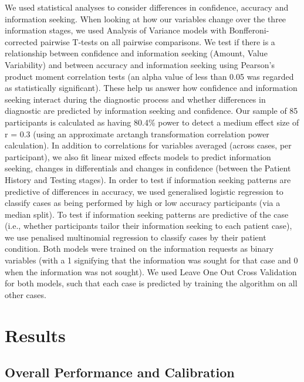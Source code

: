 \documentclass[a4paper, nobind]{templates/ociamthesis}
\begin{document}
\hfill\break
We used statistical analyses to consider differences in confidence, accuracy and information seeking. When looking at how our variables change over the three information stages, we used Analysis of Variance models with Bonfferoni-corrected pairwise T-tests on all pairwise comparisons. We test if there is a relationship between confidence and information seeking (Amount, Value Variability) and between accuracy and information seeking using Pearson's product moment correlation tests (an alpha value of less than 0.05 was regarded as statistically significant). These help us answer how confidence and information seeking interact during the diagnostic process and whether differences in diagnostic are predicted by information seeking and confidence. Our sample of 85 participants is calculated as having 80.4\% power to detect a medium effect size of r = 0.3 (using an approximate arctangh transformation correlation power calculation). In addition to correlations for variables averaged (across cases, per participant), we also fit linear mixed effects models to predict information seeking, changes in differentials and changes in confidence (between the Patient History and Testing stages). In order to test if information seeking patterns are predictive of differences in accuracy, we used generalised logistic regression to classify cases as being performed by high or low accuracy participants (via a median split). To test if information seeking patterns are predictive of the case (i.e., whether participants tailor their information seeking to each patient case), we use penalised multinomial regression to classify cases by their patient condition. Both models were trained on the information requests as binary variables (with a 1 signifying that the information was sought for that case and 0 when the information was not sought). We used Leave One Out Cross Validation for both models, such that each case is predicted by training the algorithm on all other cases.

\section{Results}\label{results-1}

\subsection{Overall Performance and Calibration}\label{overall-performance-and-calibration}
\end{document}
